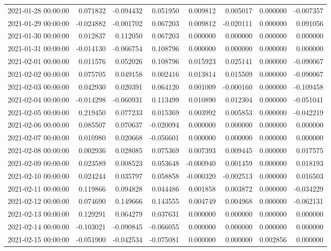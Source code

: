 \begin{tabular}{lrrrrrrr}
2021-01-28 00:00:00 & 0.071832 & -0.094432 & 0.051950 & 0.009812 & 0.005017 & 0.000000 & -0.007357 \\
2021-01-29 00:00:00 & -0.024882 & -0.001702 & 0.067203 & 0.009812 & -0.020111 & 0.000000 & 0.091056 \\
2021-01-30 00:00:00 & 0.012837 & 0.112050 & 0.067203 & 0.000000 & 0.000000 & 0.000000 & 0.000000 \\
2021-01-31 00:00:00 & -0.014130 & -0.066754 & 0.108796 & 0.000000 & 0.000000 & 0.000000 & 0.000000 \\
2021-02-01 00:00:00 & 0.011576 & 0.052026 & 0.108796 & 0.015923 & 0.025141 & 0.000000 & -0.090067 \\
2021-02-02 00:00:00 & 0.075705 & 0.049158 & 0.002416 & 0.013814 & 0.015509 & 0.000000 & -0.090067 \\
2021-02-03 00:00:00 & 0.042930 & 0.020391 & 0.064120 & 0.001009 & -0.000160 & 0.000000 & -0.109458 \\
2021-02-04 00:00:00 & -0.014298 & -0.060931 & 0.113499 & 0.010890 & 0.012304 & 0.000000 & -0.051041 \\
2021-02-05 00:00:00 & 0.219450 & 0.077233 & 0.015369 & 0.003992 & 0.005853 & 0.000000 & -0.042219 \\
2021-02-06 00:00:00 & 0.085507 & 0.070637 & -0.020094 & 0.000000 & 0.000000 & 0.000000 & 0.000000 \\
2021-02-07 00:00:00 & 0.010980 & 0.020668 & -0.056601 & 0.000000 & 0.000000 & 0.000000 & 0.000000 \\
2021-02-08 00:00:00 & 0.002936 & 0.028085 & 0.075369 & 0.007393 & 0.009445 & 0.000000 & 0.017575 \\
2021-02-09 00:00:00 & 0.023589 & 0.008523 & 0.053648 & -0.000940 & 0.001459 & 0.000000 & 0.018193 \\
2021-02-10 00:00:00 & 0.024244 & 0.035797 & 0.058858 & -0.000320 & -0.002513 & 0.000000 & 0.016503 \\
2021-02-11 00:00:00 & 0.119866 & 0.094828 & 0.044486 & 0.001858 & 0.003872 & 0.000000 & -0.034229 \\
2021-02-12 00:00:00 & 0.074690 & 0.149666 & 0.143555 & 0.004749 & 0.004968 & 0.000000 & -0.062131 \\
2021-02-13 00:00:00 & 0.129291 & 0.064279 & 0.037631 & 0.000000 & 0.000000 & 0.000000 & 0.000000 \\
2021-02-14 00:00:00 & -0.103021 & -0.090845 & -0.066055 & 0.000000 & 0.000000 & 0.000000 & 0.000000 \\
2021-02-15 00:00:00 & -0.051900 & -0.042534 & -0.075081 & 0.000000 & 0.000000 & 0.002856 & 0.000000 \\

\end{tabular}
